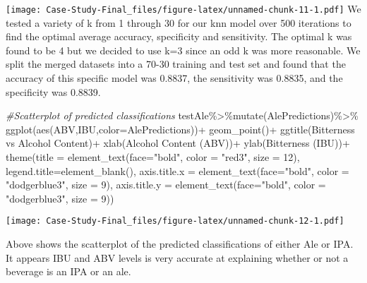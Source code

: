 \documentclass[
]{article}
\newenvironment{Shaded}{\begin{snugshade}}{\end{snugshade}}
\newcommand{\AttributeTok}[1]{\textcolor[rgb]{0.77,0.63,0.00}{#1}}
\newcommand{\CommentTok}[1]{\textcolor[rgb]{0.56,0.35,0.01}{\textit{#1}}}
\newcommand{\DecValTok}[1]{\textcolor[rgb]{0.00,0.00,0.81}{#1}}
\newcommand{\FunctionTok}[1]{\textcolor[rgb]{0.00,0.00,0.00}{#1}}
\newcommand{\NormalTok}[1]{#1}
\newcommand{\SpecialCharTok}[1]{\textcolor[rgb]{0.00,0.00,0.00}{#1}}
\newcommand{\StringTok}[1]{\textcolor[rgb]{0.31,0.60,0.02}{#1}}
\begin{document}
\texttt{[image: Case-Study-Final\_files/figure-latex/unnamed-chunk-11-1.pdf]}
We tested a variety of k from 1 through 30 for our knn model over 500
iterations to find the optimal average accuracy, specificity and
sensitivity. The optimal k was found to be 4 but we decided to use k=3
since an odd k was more reasonable. We split the merged datasets into a
70-30 training and test set and found that the accuracy of this specific
model was 0.8837, the sensitivity was 0.8835, and the specificity was
0.8839.

\begin{Shaded}
\begin{Highlighting}[]
\CommentTok{\#Scatterplot of predicted classifications}
\NormalTok{testAle}\SpecialCharTok{\%\textgreater{}\%}\FunctionTok{mutate}\NormalTok{(AlePredictions)}\SpecialCharTok{\%\textgreater{}\%}
  \FunctionTok{ggplot}\NormalTok{(}\FunctionTok{aes}\NormalTok{(ABV,IBU,}\AttributeTok{color=}\NormalTok{AlePredictions))}\SpecialCharTok{+}
  \FunctionTok{geom\_point}\NormalTok{()}\SpecialCharTok{+}
  \FunctionTok{ggtitle}\NormalTok{(}\StringTok{\textquotesingle{}Bitterness vs Alcohol Content\textquotesingle{}}\NormalTok{)}\SpecialCharTok{+}
  \FunctionTok{xlab}\NormalTok{(}\StringTok{\textquotesingle{}Alcohol Content (ABV)\textquotesingle{}}\NormalTok{)}\SpecialCharTok{+}
  \FunctionTok{ylab}\NormalTok{(}\StringTok{\textquotesingle{}Bitterness (IBU)\textquotesingle{}}\NormalTok{)}\SpecialCharTok{+}
  \FunctionTok{theme}\NormalTok{(}\AttributeTok{title =} \FunctionTok{element\_text}\NormalTok{(}\AttributeTok{face=}\StringTok{"bold"}\NormalTok{, }\AttributeTok{color =} \StringTok{"red3"}\NormalTok{, }\AttributeTok{size =} \DecValTok{12}\NormalTok{),}
        \AttributeTok{legend.title=}\FunctionTok{element\_blank}\NormalTok{(),}
        \AttributeTok{axis.title.x =} \FunctionTok{element\_text}\NormalTok{(}\AttributeTok{face=}\StringTok{"bold"}\NormalTok{, }\AttributeTok{color =} \StringTok{"dodgerblue3"}\NormalTok{, }\AttributeTok{size =} \DecValTok{9}\NormalTok{),}
        \AttributeTok{axis.title.y =} \FunctionTok{element\_text}\NormalTok{(}\AttributeTok{face=}\StringTok{"bold"}\NormalTok{, }\AttributeTok{color =} \StringTok{"dodgerblue3"}\NormalTok{, }\AttributeTok{size =} \DecValTok{9}\NormalTok{))}
\end{Highlighting}
\end{Shaded}

\texttt{[image: Case-Study-Final\_files/figure-latex/unnamed-chunk-12-1.pdf]}

Above shows the scatterplot of the predicted classifications of either
Ale or IPA. It appears IBU and ABV levels is very accurate at explaining
whether or not a beverage is an IPA or an ale.
\end{document}
